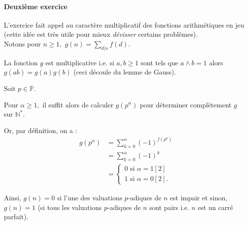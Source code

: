 \paragraph{Deuxième exercice}

L'exercice fait appel au caractère multiplicatif des fonctions arithmétiques en jeu (cette idée est très utile pour mieux \emph{dévisser} certains problèmes).\\

Notons pour $n\geq 1,$ $\displaystyle g(n)=\sum_{d|n}f(d).$ 

La fonction $g$ est multiplicative i.e. si $a,b\geq 1$ sont tels que $a\wedge b=1$ alors $\displaystyle g(ab)=g(a)g(b)$ (ceci découle du lemme de Gauss).

Soit $p\in \mathbb{P}.$ 

Pour $\alpha\geq 1,$ il suffit alors de calculer $g(p^{\alpha})$ pour déterminer complètement $g$ sur $\mathbb{N}^{*}.$

Or, par définition, on a :
\begin{align*}
g(p^{\alpha}) & =\sum_{k=0}^{\alpha}(-1)^{f(p^{k})}\\
& =\sum_{k=0}^{\alpha}(-1)^{k}\\
& =\left\{ \begin{array}{l}
0 \mbox{ si } \alpha=1 [2]\\
1 \mbox{ si } \alpha=0 [2].
\end{array}\right.
\end{align*}

Ainsi, $g(n)=0$ si l'une des valuations $p$-adiques de $n$ est impair et sinon, $g(n)=1$ (si tous les valuations $p$-adiques de $n$ sont pairs i.e. $n$ est un carré parfait).

